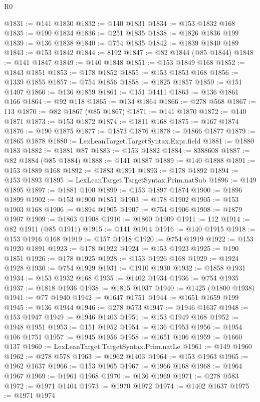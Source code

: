 \begin{lexlean}{R0}
\begin{coremodule}
@1831 := @141 @1830
@1832 := @140 @1831
@1834 := @153 @1832 @168
@1835 := @190 @1834
@1836 := @251 @1835
@1838 := @1826 @1836 @199
@1839 := @136 @1838
@1840 := @754 @1835
@1842 := @1839 @1840 @189
@1843 := @153 @1842
@1844 := 8192
@1847 := @82 @1844 (@85 @1844)
@1848 := @141 @1847
@1849 := @140 @1848
@1851 := @153 @1849 @168
@1852 := @1843 @1851
@1853 := @178 @1852
@1855 := @153 @1853 @168
@1856 := @1339 @1855
@1857 := @754 @1856
@1858 := @1825 @1857
@1859 := @151 @1407
@1860 := @136 @1859
@1861 := @151 @1411
@1863 := @136 @1861 @166
@1864 := @92 @118
@1865 := @134 @1864
@1866 := @278 @568
@1867 := 113
@1870 := @82 @1867 (@85 @1867)
@1871 := @141 @1870
@1872 := @140 @1871
@1873 := @153 @1872
@1874 := @1811 @168
@1875 := @167 @1874
@1876 := @190 @1875
@1877 := @1873 @1876
@1878 := @1866 @1877
@1879 := @1865 @1878
@1880 := LexLeanTarget.TargetSyntax.Expr.field
@1881 := @1880 @183
@1882 := @1881 @87
@1883 := @153 @1882
@1884 := 8388608
@1887 := @82 @1884 (@85 @1884)
@1888 := @141 @1887
@1889 := @140 @1888
@1891 := @153 @1889 @168
@1892 := @1883 @1891
@1893 := @178 @1892
@1894 := @153 @1893
@1895 := LexLeanTarget.TargetSyntax.Prim.natSub
@1896 := @149 @1895
@1897 := @1881 @100
@1899 := @153 @1897 @1874
@1900 := @1896 @1899
@1902 := @153 @1900 @1851
@1903 := @178 @1902
@1905 := @153 @1903 @168
@1906 := @1894 @1905
@1907 := @754 @1906
@1908 := @1879 @1907
@1909 := @1863 @1908
@1910 := @1860 @1909
@1911 := 112
@1914 := @82 @1911 (@85 @1911)
@1915 := @141 @1914
@1916 := @140 @1915
@1918 := @153 @1916 @168
@1919 := @157 @1918
@1920 := @754 @1919
@1922 := @153 @1920 @1891
@1923 := @178 @1922
@1924 := @153 @1923
@1925 := @190 @1851
@1926 := @178 @1925
@1928 := @153 @1926 @168
@1929 := @1924 @1928
@1930 := @754 @1929
@1931 := @1910 @1930
@1932 := @1858 @1931
@1934 := @153 @1932 @168
@1935 := @1402 @1934
@1936 := @754 @1935
@1937 := @1818 @1936
@1938 := @1815 @1937
@1940 := @1425 (@1800 @1938)
@1941 := @77 @1940
@1942 := @1647 @1751
@1944 := @1651 @1659 @199
@1945 := @136 @1944
@1946 := @278 @573
@1947 := @1946 @1637
@1948 := @153 @1947
@1949 := @1946 @1403
@1951 := @153 @1949 @168
@1952 := @1948 @1951
@1953 := @151 @1952
@1954 := @136 @1953
@1956 := @1954 @106 @1751
@1957 := @1945 @1956
@1958 := @1651 @106
@1959 := @1660 @137
@1960 := LexLeanTarget.TargetSyntax.Prim.natLe
@1961 := @149 @1960
@1962 := @278 @578
@1963 := @1962 @1403
@1964 := @153 @1963
@1965 := @1962 @1637
@1966 := @153 @1965
@1967 := @1966 @168
@1968 := @1964 @1967
@1969 := @1961 @1968
@1970 := @136 @1969
@1971 := @278 @583
@1972 := @1971 @1404
@1973 := @1970 @1972
@1974 := @1402 @1637
@1975 := @1971 @1974

\end{coremodule}
\end{lexlean}

